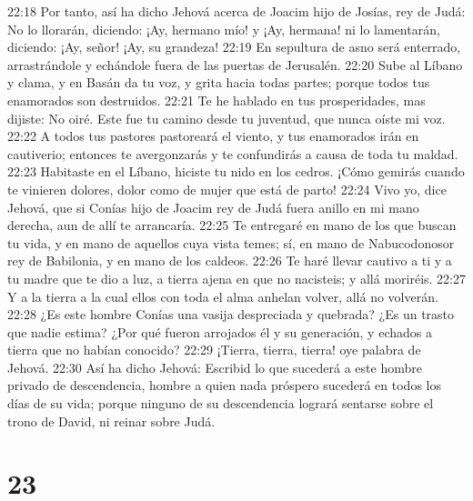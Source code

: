 22:18 Por tanto, así ha dicho Jehová acerca de Joacim hijo de Josías, rey de Judá: No lo llorarán, diciendo: ¡Ay, hermano mío! y ¡Ay, hermana! ni lo lamentarán, diciendo: ¡Ay, señor! ¡Ay, su grandeza!  
22:19 En sepultura de asno será enterrado, arrastrándole y echándole fuera de las puertas de Jerusalén.  
22:20 Sube al Líbano y clama, y en Basán da tu voz, y grita hacia todas partes; porque todos tus enamorados son destruidos.  
22:21 Te he hablado en tus prosperidades, mas dijiste: No oiré. Este fue tu camino desde tu juventud, que nunca oíste mi voz.  
22:22 A todos tus pastores pastoreará el viento, y tus enamorados irán en cautiverio; entonces te avergonzarás y te confundirás a causa de toda tu maldad.  
22:23 Habitaste en el Líbano, hiciste tu nido en los cedros. ¡Cómo gemirás cuando te vinieren dolores, dolor como de mujer que está de parto!  
22:24 Vivo yo, dice Jehová, que si Conías hijo de Joacim rey de Judá fuera anillo en mi mano derecha, aun de allí te arrancaría.  
22:25 Te entregaré en mano de los que buscan tu vida, y en mano de aquellos cuya vista temes; sí, en mano de Nabucodonosor rey de Babilonia, y en mano de los caldeos.  
22:26 Te haré llevar cautivo a ti y a tu madre que te dio a luz, a tierra ajena en que no nacisteis; y allá moriréis.  
22:27 Y a la tierra a la cual ellos con toda el alma anhelan volver, allá no volverán.  
22:28 ¿Es este hombre Conías una vasija despreciada y quebrada? ¿Es un trasto que nadie estima? ¿Por qué fueron arrojados él y su generación, y echados a tierra que no habían conocido?  
22:29 ¡Tierra, tierra, tierra! oye palabra de Jehová.  
22:30 Así ha dicho Jehová: Escribid lo que sucederá a este hombre privado de descendencia, hombre a quien nada próspero sucederá en todos los días de su vida; porque ninguno de su descendencia logrará sentarse sobre el trono de David, ni reinar sobre Judá.  

\chapter{23}

